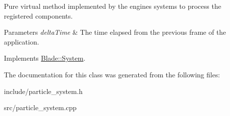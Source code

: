 Pure virtual method implemented by the engine\textquotesingle{}s systems to process the registered components. 


\begin{DoxyParams}{Parameters}
{\em delta\+Time} & The time elapsed from the previous frame of the application. \\
\hline
\end{DoxyParams}


Implements \hyperlink{class_blade_1_1_system_a80c186f5f9f8fa4fd317b861853fe6a8}{Blade\+::\+System}.



The documentation for this class was generated from the following files\+:\begin{DoxyCompactItemize}
\item 
include/particle\+\_\+system.\+h\item 
src/particle\+\_\+system.\+cpp\end{DoxyCompactItemize}
